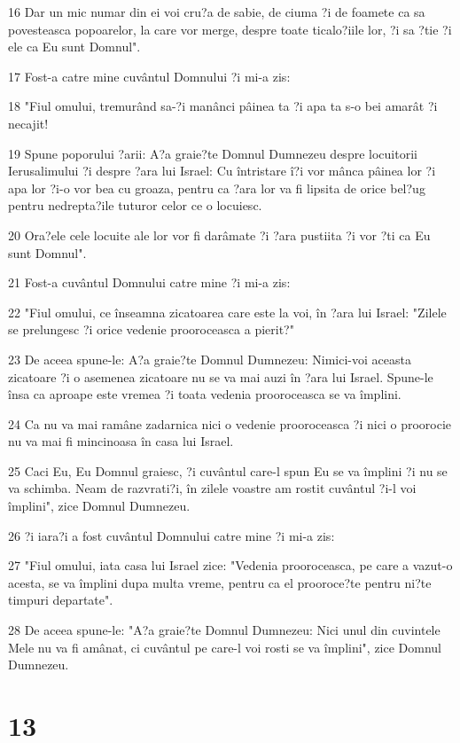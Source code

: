 \par 16 Dar un mic numar din ei voi cru?a de sabie, de ciuma ?i de foamete ca sa povesteasca popoarelor, la care vor merge, despre toate ticalo?iile lor, ?i sa ?tie ?i ele ca Eu sunt Domnul".
\par 17 Fost-a catre mine cuvântul Domnului ?i mi-a zis:
\par 18 "Fiul omului, tremurând sa-?i manânci pâinea ta ?i apa ta s-o bei amarât ?i necajit!
\par 19 Spune poporului ?arii: A?a graie?te Domnul Dumnezeu despre locuitorii Ierusalimului ?i despre ?ara lui Israel: Cu întristare î?i vor mânca pâinea lor ?i apa lor ?i-o vor bea cu groaza, pentru ca ?ara lor va fi lipsita de orice bel?ug pentru nedrepta?ile tuturor celor ce o locuiesc.
\par 20 Ora?ele cele locuite ale lor vor fi darâmate ?i ?ara pustiita ?i vor ?ti ca Eu sunt Domnul".
\par 21 Fost-a cuvântul Domnului catre mine ?i mi-a zis:
\par 22 "Fiul omului, ce înseamna zicatoarea care este la voi, în ?ara lui Israel: "Zilele se prelungesc ?i orice vedenie prooroceasca a pierit?"
\par 23 De aceea spune-le: A?a graie?te Domnul Dumnezeu: Nimici-voi aceasta zicatoare ?i o asemenea zicatoare nu se va mai auzi în ?ara lui Israel. Spune-le însa ca aproape este vremea ?i toata vedenia prooroceasca se va împlini.
\par 24 Ca nu va mai ramâne zadarnica nici o vedenie prooroceasca ?i nici o proorocie nu va mai fi mincinoasa în casa lui Israel.
\par 25 Caci Eu, Eu Domnul graiesc, ?i cuvântul care-l spun Eu se va împlini ?i nu se va schimba. Neam de razvrati?i, în zilele voastre am rostit cuvântul ?i-l voi împlini", zice Domnul Dumnezeu.
\par 26 ?i iara?i a fost cuvântul Domnului catre mine ?i mi-a zis:
\par 27 "Fiul omului, iata casa lui Israel zice: "Vedenia prooroceasca, pe care a vazut-o acesta, se va împlini dupa multa vreme, pentru ca el prooroce?te pentru ni?te timpuri departate".
\par 28 De aceea spune-le: "A?a graie?te Domnul Dumnezeu: Nici unul din cuvintele Mele nu va fi amânat, ci cuvântul pe care-l voi rosti se va împlini", zice Domnul Dumnezeu.

\chapter{13}

